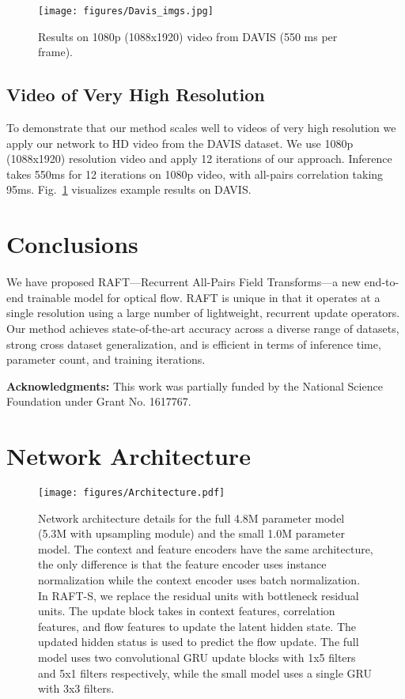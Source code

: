 \documentclass[runningheads]{llncs}
\begin{document}
\begin{figure}[h]
    \centering
	\texttt{[image: figures/Davis\_imgs.jpg]}
	\caption{Results on 1080p (1088x1920) video from DAVIS (550 ms per frame).}
	\label{fig:DAVIS}
\end{figure}


\subsection{Video of Very High Resolution}
To demonstrate that our method scales well to videos of very high resolution we apply our network to HD video from the DAVIS\cite{davis} dataset. We use 1080p (1088x1920) resolution video and apply 12 iterations of our approach. Inference takes 550ms for 12 iterations on 1080p video, with all-pairs correlation taking 95ms. Fig.~\ref{fig:DAVIS} visualizes example results on DAVIS. 

\section{Conclusions}
We have proposed RAFT---Recurrent All-Pairs Field Transforms---a new end-to-end trainable model for optical flow.  RAFT is unique in that it operates at a single resolution using a large number of lightweight, recurrent update operators. Our method achieves state-of-the-art accuracy across a diverse range of datasets, strong cross dataset generalization, and is efficient in terms of inference time, parameter count, and training iterations.

\smallskip \noindent \textbf{Acknowledgments: }  This  work was partially funded by the National Science Foundation under Grant No. 1617767.





\clearpage

\appendix


\section{Network Architecture}
\vspace{-5mm}

\begin{figure}[h]
    \centering
	\texttt{[image: figures/Architecture.pdf]}
	\vspace{-3mm}
	\caption{Network architecture details for the full 4.8M parameter model (5.3M with upsampling module) and the small 1.0M parameter model. The context and feature encoders have the same architecture, the only difference is that the feature encoder uses instance normalization while the context encoder uses batch normalization. In RAFT-S, we replace the residual units with bottleneck residual units. The update block takes in context features, correlation features, and flow features to update the latent hidden state. The updated hidden status is used to predict the flow update. The full model uses two convolutional GRU update blocks with 1x5 filters and 5x1 filters respectively, while the small model uses a single GRU with 3x3 filters.}
	\label{fig:A1}
	\vspace{-6mm}
\end{figure}
\end{document}

